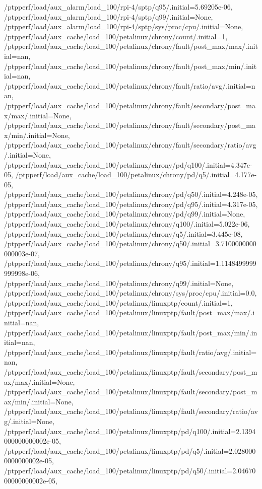 {    /ptpperf/load/aux_alarm/load_100/rpi-4/sptp/q95/.initial=5.69205e-06,
    /ptpperf/load/aux_alarm/load_100/rpi-4/sptp/q99/.initial=None,
    /ptpperf/load/aux_alarm/load_100/rpi-4/sptp/sys/proc/cpu/.initial=None,
    /ptpperf/load/aux_cache/load_100/petalinux/chrony/count/.initial=1,
    /ptpperf/load/aux_cache/load_100/petalinux/chrony/fault/post_max/max/.initial=nan,
    /ptpperf/load/aux_cache/load_100/petalinux/chrony/fault/post_max/min/.initial=nan,
    /ptpperf/load/aux_cache/load_100/petalinux/chrony/fault/ratio/avg/.initial=nan,
    /ptpperf/load/aux_cache/load_100/petalinux/chrony/fault/secondary/post_max/max/.initial=None,
    /ptpperf/load/aux_cache/load_100/petalinux/chrony/fault/secondary/post_max/min/.initial=None,
    /ptpperf/load/aux_cache/load_100/petalinux/chrony/fault/secondary/ratio/avg/.initial=None,
    /ptpperf/load/aux_cache/load_100/petalinux/chrony/pd/q100/.initial=4.347e-05,
    /ptpperf/load/aux_cache/load_100/petalinux/chrony/pd/q5/.initial=4.177e-05,
    /ptpperf/load/aux_cache/load_100/petalinux/chrony/pd/q50/.initial=4.248e-05,
    /ptpperf/load/aux_cache/load_100/petalinux/chrony/pd/q95/.initial=4.317e-05,
    /ptpperf/load/aux_cache/load_100/petalinux/chrony/pd/q99/.initial=None,
    /ptpperf/load/aux_cache/load_100/petalinux/chrony/q100/.initial=5.022e-06,
    /ptpperf/load/aux_cache/load_100/petalinux/chrony/q5/.initial=3.445e-08,
    /ptpperf/load/aux_cache/load_100/petalinux/chrony/q50/.initial=3.7100000000000003e-07,
    /ptpperf/load/aux_cache/load_100/petalinux/chrony/q95/.initial=1.1148499999999998e-06,
    /ptpperf/load/aux_cache/load_100/petalinux/chrony/q99/.initial=None,
    /ptpperf/load/aux_cache/load_100/petalinux/chrony/sys/proc/cpu/.initial=0.0,
    /ptpperf/load/aux_cache/load_100/petalinux/linuxptp/count/.initial=1,
    /ptpperf/load/aux_cache/load_100/petalinux/linuxptp/fault/post_max/max/.initial=nan,
    /ptpperf/load/aux_cache/load_100/petalinux/linuxptp/fault/post_max/min/.initial=nan,
    /ptpperf/load/aux_cache/load_100/petalinux/linuxptp/fault/ratio/avg/.initial=nan,
    /ptpperf/load/aux_cache/load_100/petalinux/linuxptp/fault/secondary/post_max/max/.initial=None,
    /ptpperf/load/aux_cache/load_100/petalinux/linuxptp/fault/secondary/post_max/min/.initial=None,
    /ptpperf/load/aux_cache/load_100/petalinux/linuxptp/fault/secondary/ratio/avg/.initial=None,
    /ptpperf/load/aux_cache/load_100/petalinux/linuxptp/pd/q100/.initial=2.1394000000000002e-05,
    /ptpperf/load/aux_cache/load_100/petalinux/linuxptp/pd/q5/.initial=2.0280000000000002e-05,
    /ptpperf/load/aux_cache/load_100/petalinux/linuxptp/pd/q50/.initial=2.0467000000000002e-05,
}
